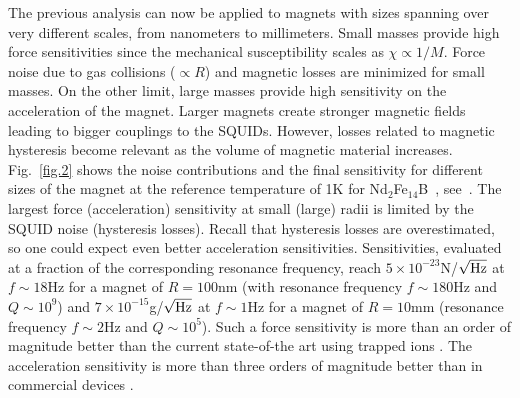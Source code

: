 \documentclass[twocolumn,superscriptaddress,floatfix,preprintnumbers,prl]{revtex4}
\begin{document}
The previous analysis  can now be applied to magnets with sizes spanning over very different scales, from nanometers to millimeters. 
Small masses provide high force sensitivities since the mechanical susceptibility scales as $\chi \propto 1/M$. Force noise due to gas collisions ($\propto R$) and magnetic losses are minimized for small masses. 
On the other limit, large masses provide high sensitivity on the acceleration of the magnet.
Larger magnets create stronger magnetic fields leading to bigger couplings to the SQUIDs. However, losses related to magnetic hysteresis become relevant as the volume of magnetic material increases.
Fig.~\ref{fig.2} shows the noise contributions and the final sensitivity for different sizes of the magnet at the reference temperature of 1K for Nd$_2$Fe$_{14}$B~\cite{coey}, see~\cite{SM}. The largest force (acceleration) sensitivity at small (large) radii is limited by the SQUID noise (hysteresis losses). Recall that hysteresis losses are overestimated, so one could expect even better acceleration sensitivities. 
Sensitivities, evaluated at a fraction of the corresponding resonance frequency, reach $5 \times 10^{-23}$N/$\sqrt{\rm Hz}$ at  $f\sim 18$Hz for a magnet of $R=100$nm (with resonance frequency $f\sim 180$Hz and $Q\sim10^9$) and $7\times10^{-15}$g/$\sqrt{\rm Hz}$ at $f\sim 1$Hz for a magnet of $R=10$mm (resonance frequency $f\sim 2$Hz and $Q\sim10^5$). Such a force sensitivity is more than an order of magnitude better than the current state-of-the art using trapped ions \cite{Biercuk2010}. The acceleration sensitivity is more than three orders of magnitude better than in commercial devices \cite{goodkind1999,christophe2015}.
\end{document}
